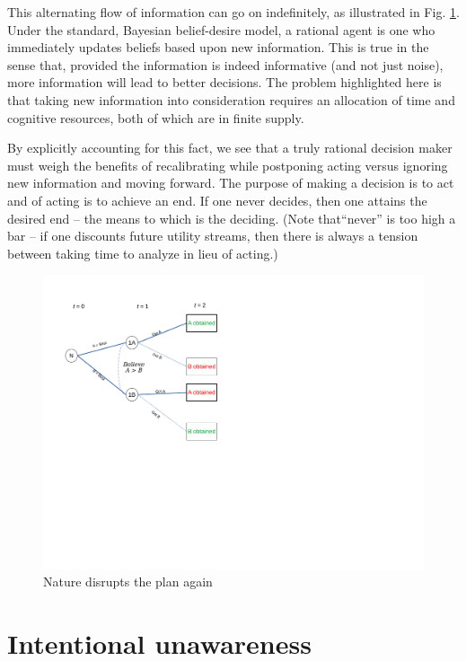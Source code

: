 \documentclass[
11pt,
titlepage,
reqno,
]{article}%
\theoremstyle{definition}
\begin{document}
This alternating flow of information can go on indefinitely, as illustrated in Fig. \ref{Diag: p-10}. Under the standard, Bayesian belief-desire model, a rational agent is one who immediately updates beliefs based upon new information. This is true in the sense that, provided the information is indeed informative (and not just noise), more information will lead to better decisions. The problem highlighted here is that taking new information into consideration requires an allocation of time and cognitive resources, both of which are in finite supply. 

By explicitly accounting for this fact, we see that a truly rational decision maker must weigh the benefits of recalibrating while postponing acting versus ignoring new information and moving forward. The purpose of making a decision is to act and of acting is to achieve an end. If one never decides, then one attains the desired end -- the means to which is the deciding. (Note that``never'' is too high a bar -- if one discounts future utility streams, then there is always a tension between taking time to analyze in lieu of acting.)

\begin{figure}[h!]
	\centering
	\includegraphics*[page=10,trim = 0 3.5in 0in 0in,scale=.65]{Awareness_Diagrams_All}
	\caption{Nature disrupts the plan again\label{Diag: p-10}}%
\end{figure}

\section*{Intentional unawareness}
\end{document}
